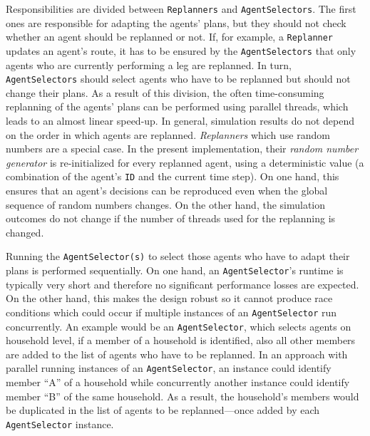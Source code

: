 Responsibilities are divided between \lstinline{Replanners} and \lstinline{AgentSelectors}. The first ones are responsible for adapting the agents' plans, but they should not check whether an agent should be replanned or not. If, for example, a \lstinline{Replanner} updates an agent's route, it has to be ensured by the \lstinline{AgentSelectors} that only agents who are currently performing a leg are replanned. In turn, \lstinline{AgentSelectors} should select agents who have to be replanned but should not change their plans. As a result of this division, the often time-consuming replanning of the agents' plans can be performed using parallel threads, which leads to an almost linear speed-up. In general, simulation results do not depend on the order in which agents are replanned. \emph{Replanners} which use random numbers are a special case. 
In the present implementation, their \emph{random number generator} is re-initialized for every replanned agent, using a deterministic value (\eg a combination of the agent's \lstinline|ID| and the current time step). On one hand, this ensures that an agent's decisions can be reproduced even when the global sequence of random numbers changes. On the other hand, the simulation outcomes do not change if the number of threads used for the replanning is changed.
%

Running the \lstinline{AgentSelector(s)} to select those agents who have to adapt their plans is performed sequentially. On one hand, an \lstinline{AgentSelector}'s runtime is typically very short and therefore no significant performance losses are expected. On the other hand, 
this makes the design robust so it cannot produce race conditions which could occur if multiple instances of an \lstinline{AgentSelector} run concurrently. An example would be an \lstinline{AgentSelector}, which selects agents on household level, \ie if a member of a household is identified, also all other members are added to the list of agents who have to be replanned. In an approach with parallel running instances of an \lstinline{AgentSelector}, an instance could identify member ``A'' of a household while concurrently another instance could identify member ``B'' of the same household. As a result, the household's members would be duplicated in the list of agents to be replanned---once added by each \lstinline{AgentSelector} instance.
%

